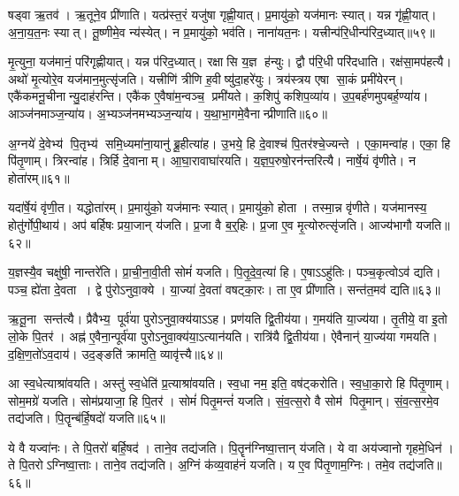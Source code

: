 षड्वा ऋ॒तव॑।
ऋ॒तूने॒व प्री॑णाति।
यत्प्र॑स्त॒रं यजु॑षा गृह्णी॒यात्।
प्र॒मायु॑को॒ यज॑मानः स्यात्।
यन्न गृ॑ह्णी॒यात्।
अ॒ना॒य॒त॒नः स्यात्।
तू॒ष्णीमे॒व न्य॑स्येत्।
न प्र॒मायु॑को॒ भव॑ति।
नाना॑यत॒नः।
यत्त्रीन्प॑रि॒धीन्प॑रिद॒ध्यात्॥५९॥

मृ॒त्युना॒ यज॑मानं॒ परि॑गृह्णीयात्।
यन्न प॑रिद॒ध्यात्।
रक्षासि य॒ज्ञ ह॑न्युः।
द्वौ प॑रि॒धी परि॑दधाति।
रक्ष॑सा॒मप॑हत्यै।
अथो॑ मृ॒त्योरे॒व यज॑मान॒मुत्सृ॑जति।
यत्त्रीणि॑ त्रीणि ह॒वीष्यु॑दा॒हरे॑युः।
त्रय॑स्त्रय एषा सा॒कं प्रमी॑येरन्।
एकै॑कमनू॒चीनान्यु॒दाह॑रन्ति।
एकै॑क ए॒वैषा॑म॒न्वञ्च॒ प्रमी॑यते।
क॒शिपु॑ कशिप॒व्या॑य।
उ॒प॒बर्\mbox{}ह॑णमुपबर्\mbox{}ह॒ण्या॑य।
आञ्ज॑नमाञ्ज॒न्या॑य।
अ॒भ्यञ्ज॑नमभ्यञ्ज॒न्या॑य।
य॒था॒भा॒गमे॒\-वैनान्प्रीणाति॥६०॥

अ॒ग्नये॑ दे॒वेभ्य॑ पि॒तृभ्य॑ समि॒ध्यमा॑ना॒यानु॑ ब्रू॒हीत्या॑ह।
उ॒भये॒ हि दे॒वाश्च॑ पि॒तर॑श्चे॒ज्यन्ते।
एका॒मन्वा॑ह।
एका॒ हि पि॑तृ॒णाम्।
त्रिरन्वा॑ह।
त्रिर्\mbox{}हि दे॒वानाम्।
आ॒घा॒रावाघा॑रयति।
य॒ज्ञ॒प॒रुषो॒रन॑न्तरित्यै।
नार्\mbox{}षे॒यं वृ॑णीते।
न होता॑रम्॥६१॥

यदा॑र्\mbox{}षे॒यं वृ॑णी॒त।
यद्धोता॑रम्।
प्र॒मायु॑को॒ यज॑मानः स्यात्।
प्र॒मायु॑को॒ होता।
तस्मा॒न्न वृ॑णीते।
यज॑मानस्य॒ होतु॑र्गोपी॒थाय॑।
अप॑ बर्\mbox{}हिषः प्रया॒जान् य॑जति।
प्र॒जा वै ब॒र्॒हिः।
प्र॒जा ए॒व मृ॒त्योरुत्सृ॑जति।
आज्य॑भागौ यजति॥६२॥

य॒ज्ञस्यै॒व चक्षु॑षी॒ नान्तरे॑ति।
प्रा॒ची॒ना॒वी॒ती सोमं॑ यजति।
पि॒तृ॒दे॒व॒त्या॑ हि।
ए॒षाऽऽहु॑तिः।
पञ्च॒कृत्वोऽव॑ द्यति।
पञ्च॒ ह्ये॑ता दे॒वता।
द्वे पु॑रोऽनुवा॒क्ये।
या॒ज्या॑ दे॒वता॑ वषट्का॒रः।
ता ए॒व प्री॑णाति।
सन्त॑त॒मव॑ द्यति॥६३॥

ऋ॒तू॒ना सन्त॑त्यै।
प्रैवैभ्य॒ पूर्व॑या पुरोऽनुवा॒क्य॑याऽऽह।
प्रण॑यति द्वि॒तीय॑या।
ग॒मय॑ति या॒ज्य॑या।
तृ॒तीये॒ वा इ॒तो लो॒के पि॒तर॑।
अह्न॑ ए॒वैना॒न्पूर्व॑या पुरोऽनुवा॒क्य॑या॒ऽत्यान॑यति।
रात्रि॑यै द्वि॒तीय॑या।
ऐवैनान्॑ या॒ज्य॑या गमयति।
द॒क्षि॒ण॒तो॑ऽव॒दाय॑।
उद॒ङ्ङति॑ क्रामति॒ व्यावृ॑त्त्यै॥६४॥

आ स्व॒धेत्याश्रा॑वयति।
अस्तु॑ स्व॒धेति॑ प्र॒त्याश्रा॑वयति।
स्व॒धा नम॒ इति॒ वष॑ट्करोति।
स्व॒धा॒का॒रो हि पि॑तृ॒णाम्।
सोम॒मग्रे॑ यजति।
सोम॑प्रयाजा॒ हि पि॒तर॑।
सोमं॑ पितृ॒मन्तं॑ यजति।
सं॒व॒त्स॒रो वै सोम॑ पितृ॒मान्।
सं॒व॒त्स॒रमे॒व तद्य॑जति।
पि॒तॄन्ब॑र्हि॒षदो॑ यजति॥६५॥

ये वै यज्वा॑नः।
ते पि॒तरो॑ बर्\mbox{}हि॒षद॑।
ताने॒व तद्य॑जति।
पि॒तॄन॑ग्निष्वा॒त्तान् य॑जति।
ये वा अय॑ज्वानो गृहमे॒धिन॑।
ते पि॒तरोऽग्निष्वा॒त्ताः।
ताने॒व तद्य॑जति।
अ॒ग्निं क॑व्य॒वाह॑नं यजति।
य ए॒व पि॑तृ॒णाम॒ग्निः।
तमे॒व तद्य॑जति॥६६॥

